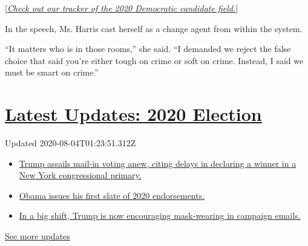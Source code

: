 {[}\emph{\href{https://www.nytimes3xbfgragh.onion/interactive/2019/us/politics/2020-presidential-candidates.html?action=click\&module=inline\&pgtype=Article}{Check
out our tracker of the 2020 Democratic candidate field.}}{]}

In the speech, Ms. Harris cast herself as a change agent from within the
system.

``It matters who is in those rooms,'' she said. ``I demanded we reject
the false choice that said you're either tough on crime or soft on
crime. Instead, I said we must be smart on crime.''

\hypertarget{latest-updates-2020-election}{%
\section{\texorpdfstring{\href{https://www.nytimes3xbfgragh.onion/2020/08/03/us/elections/biden-vs-trump.html?action=click\&pgtype=Article\&state=default\&region=MAIN_CONTENT_1\&context=storylines_live_updates}{Latest
Updates: 2020
Election}}{Latest Updates: 2020 Election}}\label{latest-updates-2020-election}}

Updated 2020-08-04T01:23:51.312Z

\begin{itemize}
\tightlist
\item
  \href{https://www.nytimes3xbfgragh.onion/2020/08/03/us/elections/biden-vs-trump.html?action=click\&pgtype=Article\&state=default\&region=MAIN_CONTENT_1\&context=storylines_live_updates\#link-6494b448}{Trump
  assails mail-in voting anew, citing delays in declaring a winner in a
  New York congressional primary.}
\item
  \href{https://www.nytimes3xbfgragh.onion/2020/08/03/us/elections/biden-vs-trump.html?action=click\&pgtype=Article\&state=default\&region=MAIN_CONTENT_1\&context=storylines_live_updates\#link-3de249e6}{Obama
  issues his first slate of 2020 endorsements.}
\item
  \href{https://www.nytimes3xbfgragh.onion/2020/08/03/us/elections/biden-vs-trump.html?action=click\&pgtype=Article\&state=default\&region=MAIN_CONTENT_1\&context=storylines_live_updates\#link-54e34d20}{In
  a big shift, Trump is now encouraging mask-wearing in campaign
  emails.}
\end{itemize}

\href{https://www.nytimes3xbfgragh.onion/2020/08/03/us/elections/biden-vs-trump.html?action=click\&pgtype=Article\&state=default\&region=MAIN_CONTENT_1\&context=storylines_live_updates}{See
more updates}

